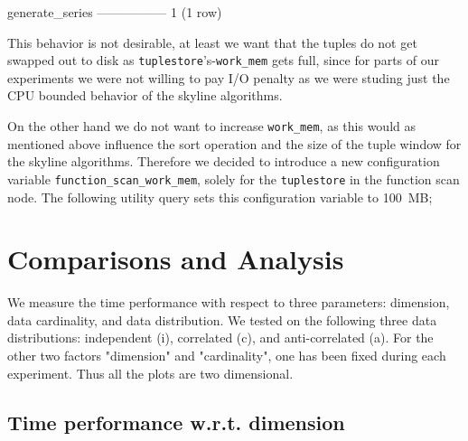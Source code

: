 \begin{interactive}
 generate_series
-----------------
               1
(1 row)
\end{interactive}

This behavior is not desirable, at least we want that the tuples do
not get swapped out to disk as
\texttt{tuplestore}'s-\texttt{work\_mem} gets full, since for parts
of our experiments we were not willing to pay I/O penalty as we were
studing just the CPU bounded behavior of the skyline algorithms.

On the other hand we do not want to increase \texttt{work\_mem}, as
this would as mentioned above influence the sort operation and the size
of the tuple window for the skyline algorithms. Therefore we decided
to introduce a new configuration variable
\texttt{function\_scan\_work\_mem}, solely for the \texttt{tuplestore}
in the function scan node. The following utility query sets this
configuration variable to 100~MB;

\begin{interactive}
\end{interactive}


\clearpage %

\section{Comparisons and Analysis}
\label{sec:analysis}
We measure the time performance with respect to three parameters:
dimension, data cardinality, and data distribution.  We tested on the
following three data distributions: independent (i), correlated (c),
and anti-correlated (a).  For the other two factors "dimension" and
"cardinality", one has been fixed during each experiment.  Thus all
the plots are two dimensional.

\subsection{Time performance w.r.t. dimension}

